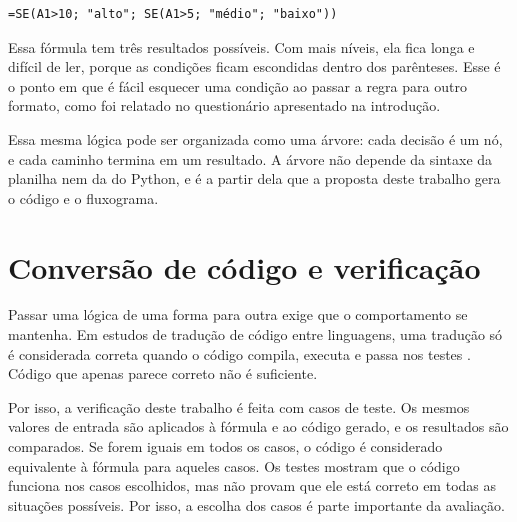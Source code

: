 \begin{verbatim}
=SE(A1>10; "alto"; SE(A1>5; "médio"; "baixo"))
\end{verbatim}

Essa fórmula tem três resultados possíveis. Com mais níveis, ela fica longa e difícil de ler, porque as condições ficam escondidas dentro dos parênteses. Esse é o ponto em que é fácil esquecer uma condição ao passar a regra para outro formato, como foi relatado no questionário apresentado na introdução.

Essa mesma lógica pode ser organizada como uma árvore: cada decisão é um nó, e cada caminho termina em um resultado. A árvore não depende da sintaxe da planilha nem da do Python, e é a partir dela que a proposta deste trabalho gera o código e o fluxograma.

\section{Conversão de código e verificação}

Passar uma lógica de uma forma para outra exige que o comportamento se mantenha. Em estudos de tradução de código entre linguagens, uma tradução só é considerada correta quando o código compila, executa e passa nos testes \cite{pan2024lost}. Código que apenas parece correto não é suficiente.

Por isso, a verificação deste trabalho é feita com casos de teste. Os mesmos valores de entrada são aplicados à fórmula e ao código gerado, e os resultados são comparados. Se forem iguais em todos os casos, o código é considerado equivalente à fórmula para aqueles casos. Os testes mostram que o código funciona nos casos escolhidos, mas não provam que ele está correto em todas as situações possíveis. Por isso, a escolha dos casos é parte importante da avaliação.
